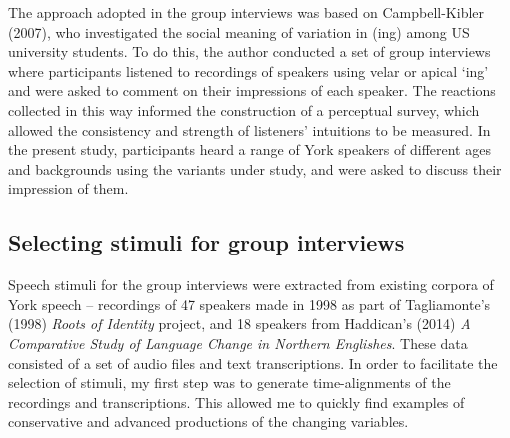 \documentclass{article}
\begin{document}

The approach adopted in the group interviews was based on Campbell-Kibler (2007), who investigated the social meaning of variation in (ing) among US university students. To do this, the author conducted a set of group interviews where participants listened to recordings of speakers using velar or apical `ing' and were asked to comment on their impressions of each speaker. The reactions collected in this way informed the construction of a perceptual survey, which allowed the consistency and strength of listeners' intuitions to be measured. In the present study, participants heard a range of York speakers of different ages and backgrounds using the variants under study, and were asked to discuss their impression of them. 

\newpage
\subsection*{Selecting stimuli for group interviews}

Speech stimuli for the group interviews were extracted from existing corpora of York speech -- recordings of 47 speakers made in 1998 as part of Tagliamonte's (1998) \textit{Roots of Identity} project, and 18 speakers from Haddican's (2014) \textit{A Comparative Study of Language Change in Northern Englishes}. These data consisted of a set of audio files and text transcriptions. In order to facilitate the selection of stimuli, my first step was to generate time-alignments of the recordings and transcriptions. This allowed me to quickly find examples of conservative and advanced productions of the changing variables.
\end{document}
